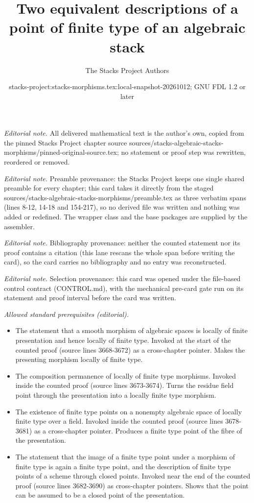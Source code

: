\documentclass[10pt,a4paper]{amsart}
\title{Two equivalent descriptions of a point of finite type of an algebraic stack}
\author{The Stacks Project Authors}
\date{stacks-project:stacks-morphisms.tex:local-snapshot-20261012; GNU FDL 1.2 or later}
\theoremstyle{plain}
\theoremstyle{definition}
\theoremstyle{remark}
\numberwithin{equation}{subsection}
\begin{document}
\maketitle
\noindent\textit{Editorial note.} All delivered mathematical text is the author's own, copied from the pinned Stacks Project chapter source sources/stacks-algebraic-stacks-morphisms/pinned-original-source.tex; no statement or proof step was rewritten, reordered or removed.\par\medskip
\noindent\textit{Editorial note.} Preamble provenance: the Stacks Project keeps one single shared preamble for every chapter; this card takes it directly from the staged sources/stacks-algebraic-stacks-morphisms/preamble.tex as three verbatim spans (lines 8-12, 14-18 and 154-217), so no derived file was written and nothing was added or redefined. The wrapper class and the base packages are supplied by the assembler.\par\medskip
\noindent\textit{Editorial note.} Bibliography provenance: neither the counted statement nor its proof contains a citation (this lane rescans the whole span before writing the card), so the card carries no bibliography and no entry was reconstructed.\par\medskip
\noindent\textit{Editorial note.} Selection provenance: this card was opened under the file-based control contract (CONTROL.md), with the mechanical pre-card gate run on its statement and proof interval before the card was written.\par\medskip
\noindent\textit{Allowed standard prerequisites (editorial).}\begin{itemize}
\item The statement that a smooth morphism of algebraic spaces is locally of finite presentation and hence locally of finite type. Invoked at the start of the counted proof (source lines 3668-3672) as a cross-chapter pointer. Makes the presenting morphism locally of finite type.
\item The composition permanence of locally of finite type morphisms. Invoked inside the counted proof (source lines 3673-3674). Turns the residue field point through the presentation into a locally finite type morphism.
\item The existence of finite type points on a nonempty algebraic space of locally finite type over a field. Invoked inside the counted proof (source lines 3678-3681) as a cross-chapter pointer. Produces a finite type point of the fibre of the presentation.
\item The statement that the image of a finite type point under a morphism of finite type is again a finite type point, and the description of finite type points of a scheme through closed points. Invoked near the end of the counted proof (source lines 3682-3690) as cross-chapter pointers. Shows that the point can be assumed to be a closed point of the presentation.
\end{itemize}\medskip
\end{document}
